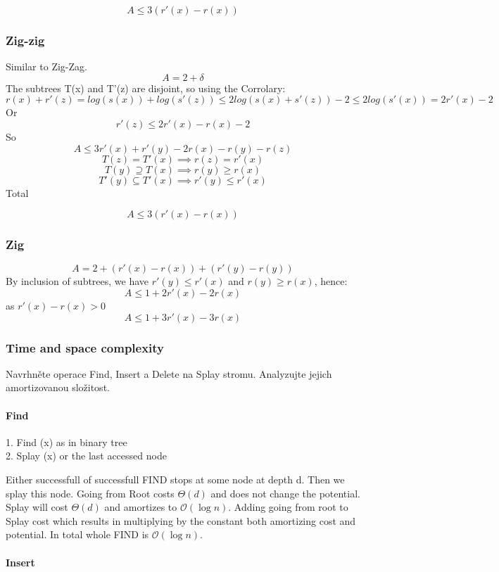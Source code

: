 \documentclass[12pt]{article}
\newcommand{\bigO}{\mathcal{O}}
\begin{document}
\[ A \leq 3(r'(x) - r(x)) \]

\subsubsection*{Zig-zig}
Similar to Zig-Zag.
\[ A = 2 + \delta \]
The subtrees T(x) and T'(z) are disjoint, so using the Corrolary:
\[ r(x) + r'(z) = log(s(x)) + log(s'(z)) \leq 2log(s(x) + s'(z)) - 2 \leq 2log(s'(x)) = 2r'(x) - 2 \]
Or
\[ r'(z) \leq 2r'(x) - r(x) - 2 \]
So
\[ A \leq 3r'(x) + r'(y) - 2r(x) - r(y) - r(z) \]
\[ T(z) = T'(x) \implies r(z) = r'(x) \]
\[ T(y) \supseteq T(x) \implies r(y) \geq r(x) \]
\[ T'(y) \subseteq T'(x) \implies r'(y) \leq r'(x) \]
Total

\[ A \leq 3(r'(x) - r(x)) \]

\subsubsection*{Zig}

\[ A = 2 + (r'(x) - r(x)) + (r'(y) - r(y)) \]
By inclusion of subtrees, we have $ r'(y) \leq r'(x) $ and $ r(y) \geq r(x) $, hence:
\[ A \leq 1 + 2r'(x) - 2r(x) \]
as $ r'(x) - r(x) > 0 $
\[ A \leq 1 + 3r'(x) - 3r(x) \]

\subsubsection{Time and space complexity}

Navrhněte operace Find, Insert a Delete na Splay stromu. Analyzujte jejich amortizovanou složitost.

\paragraph{Find}
1. Find (x) as in binary tree \\
2. Splay (x) or the last accessed node

Either successfull of successfull FIND stops at some node at depth d. Then we splay this node.
Going from Root costs $ \Theta(d) $ and does not change the potential. Splay will cost $ \Theta(d) $ and amortizes to $\bigO(\log n)$. Adding going from root to Splay cost which results in multiplying by the constant both amortizing cost and potential. In total whole FIND is $\bigO(\log n)$.

\paragraph{Insert}
\end{document}
